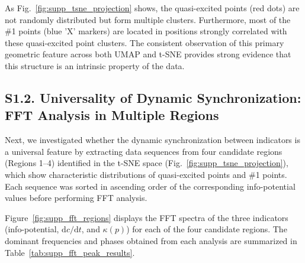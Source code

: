 \documentclass[a4paper,12pt]{article}
\begin{document}
As Fig.~\ref{fig:supp_tsne_projection} shows, the quasi-excited points (red dots) are not randomly distributed but form multiple clusters. Furthermore, most of the \#1 points (blue 'X' markers) are located in positions strongly correlated with these quasi-excited point clusters. The consistent observation of this primary geometric feature across both UMAP and t-SNE provides strong evidence that this structure is an intrinsic property of the data.

\subsection*{S1.2. Universality of Dynamic Synchronization: FFT Analysis in Multiple Regions}
\label{subsec:supp_fft}

Next, we investigated whether the dynamic synchronization between indicators is a universal feature by extracting data sequences from four candidate regions (Regions 1--4) identified in the t-SNE space (Fig.~\ref{fig:supp_tsne_projection}), which show characteristic distributions of quasi-excited points and \#1 points. Each sequence was sorted in ascending order of the corresponding info-potential values before performing FFT analysis.

Figure~\ref{fig:supp_fft_regions} displays the FFT spectra of the three indicators (info-potential, $\mathrm{d}c/\mathrm{d}t$, and $\kappa(p)$) for each of the four candidate regions. The dominant frequencies and phases obtained from each analysis are summarized in Table~\ref{tab:supp_fft_peak_results}.
\end{document}
